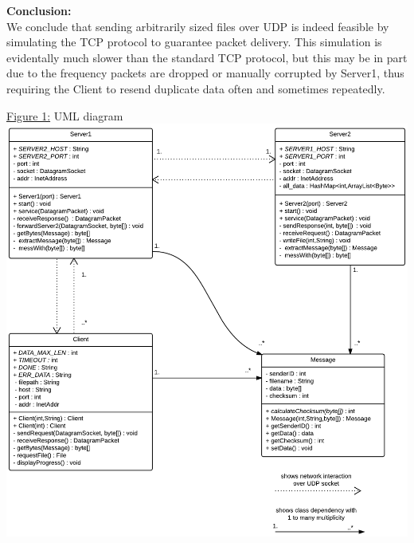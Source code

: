 \documentclass[12pt]{article}
\begin{document}
\noindent
{\bf Conclusion:}
\vspace{2mm} \\
We conclude that sending arbitrarily sized files over UDP is indeed feasible
by simulating the TCP protocol to guarantee packet delivery. This simulation is
evidentally much slower than the standard TCP protocol, but this may be in part due to the 
frequency packets are dropped or manually corrupted by Server1, thus requiring the Client
to resend duplicate data often and sometimes repeatedly. 

\pagebreak
\underline{Figure 1:} UML diagram 
\vspace{5mm}\\
\includegraphics[width=17cm]{uml.png}
\vspace{5mm}
\end{document}
